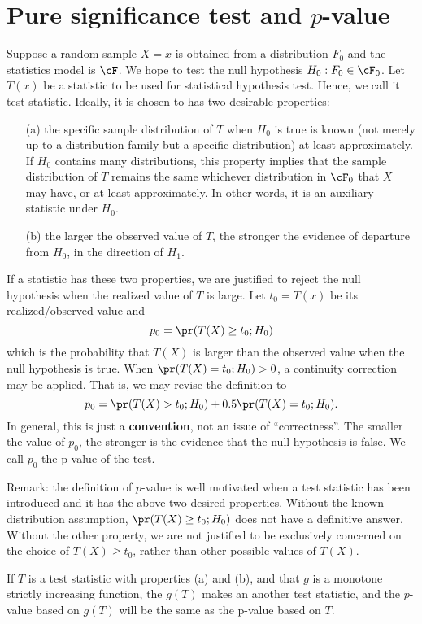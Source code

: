 \section{Pure significance test and $p$-value}
Suppose a random sample $X=x$ is obtained from a distribution
$F_0$ and the statistics model is $\cF$. 
We hope to test the null hypothesis $H_0: F_0 \in  \cF_0$.
Let $T(x)$ be a statistic to be used for statistical hypothesis test.
Hence, we call it test statistic. Ideally, it is chosen to
has two desirable properties:
\begin{itemize}
\item[(a)] 
the specific sample distribution of $T$ when $H_0$ is true is known
(not merely up to a distribution family but a specific distribution)
at least approximately. If $H_0$ contains many distributions, 
this property implies that the sample distribution of $T$ remains 
the same whichever distribution in $\cF_0$ that $X$ may have, 
or at least approximately. In other words, it is an auxiliary statistic
under $H_0$.

\item[(b)] 
the larger the observed value of $T$, the stronger the evidence
of departure from $H_0$, in the direction of $H_1$.
\end{itemize}

If a statistic has these two properties, we are justified to reject the null
hypothesis when the realized value of $T$ is large.
Let $t_0 = T(x)$ be its realized/observed value and
\[
p_0 = \pr( T(X) \geq t_0; H_0)
\]
which is the probability that $T(X)$ is larger than the observed value
when the null hypothesis is true.
When $\pr(T(X) = t_0; H_0) > 0$, a continuity correction may be
applied. That is, we may revise the definition to
\[
p_0 = \pr( T(X) > t_0; H_0) + 0.5 \pr( T(X) = t_0; H_0).
\]
In general, this is just a {\bf convention}, not an issue of ``correctness''.
The smaller the value of $p_0$, the stronger is the evidence that
the null hypothesis is false. We call $p_0$ the p-value
of the test. 

Remark: the definition of $p$-value is well motivated when a
test statistic has been introduced and it has the above two desired properties.
Without the known-distribution assumption, $\pr( T(X) \geq t_0; H_0)$
does not have a definitive answer. Without the other property, we
are not justified to be exclusively concerned on the choice of $T(X) \geq t_0$,
rather than other possible values of $T(X)$.

If $T$ is a test statistic with properties (a) and (b), and that $g$ is
a monotone strictly increasing function, the $g(T)$ makes an
another test statistic, and the $p$-value based on $g(T)$ will be the
same as the p-value based on $T$.

